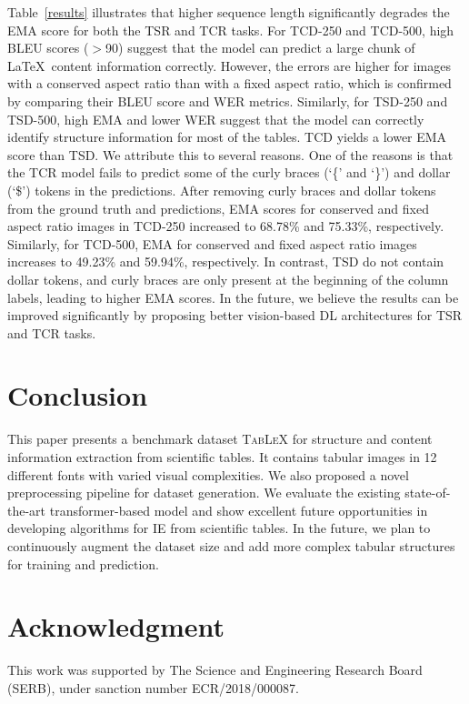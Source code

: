 \documentclass[runningheads]{llncs}
\begin{document}
Table~\ref{results} illustrates that higher sequence length significantly degrades the EMA score for both the TSR and TCR tasks. For TCD-250 and TCD-500, high BLEU scores ($>$90) suggest that the model can predict a large chunk of \LaTeX~content information correctly. However, the errors are higher for images with a conserved aspect ratio than with a fixed aspect ratio, which is confirmed by comparing their BLEU score and WER metrics. Similarly, for TSD-250 and TSD-500, high EMA and lower WER suggest that the model can correctly identify structure information for most of the tables. 
TCD yields a lower EMA score than TSD. We attribute this to several reasons. One of the reasons is that the TCR model fails to predict some of the curly braces (`\{' and `\}') and dollar (`\$') tokens in the predictions. After removing curly braces and dollar tokens from the ground truth and predictions, EMA scores for conserved and fixed aspect ratio images in TCD-250 increased to 68.78\% and 75.33\%, respectively. Similarly, for TCD-500, EMA for conserved and fixed aspect ratio images increases to 49.23\% and 59.94\%, respectively. In contrast, TSD do not contain dollar tokens, and curly braces are only present at the beginning of the column labels, leading to higher EMA scores. In the future, we believe the results can be improved significantly by proposing better vision-based DL architectures for TSR and TCR tasks. 



\section{Conclusion}
\label{section6}
This paper presents a benchmark dataset \textsc{TabLeX}  for structure and content information extraction from scientific tables. It contains tabular images in 12 different fonts with varied visual complexities. We also proposed a novel preprocessing pipeline for dataset generation. We evaluate the existing state-of-the-art transformer-based model and show excellent future opportunities in developing algorithms for IE from scientific tables. In the future, we plan to continuously augment the dataset size and add more complex tabular structures for training and prediction. 

\section*{Acknowledgment}
This work was supported by The Science and
Engineering Research Board (SERB), under sanction number ECR/2018/000087.



\end{document}

